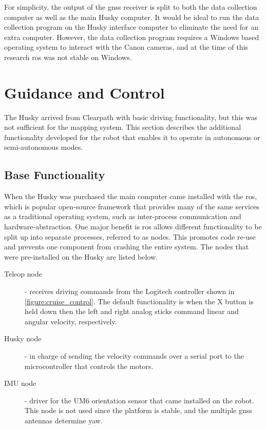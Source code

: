 For simplicity, the output of the \ac{gnss} receiver is split to both the data collection computer as well as the main Husky computer.  It would be ideal to run the data collection program on the Husky interface computer to eliminate the need for an extra computer.  However, the data collection program requires a Windows based operating system to interact with the Canon cameras, and at the time of this research \ac{ros} was not stable on Windows. 

\section{Guidance and Control}

The Husky arrived from Clearpath with basic driving functionality, but this was not sufficient for the mapping system.  This section describes the additional functionality developed for the robot that enables it to operate in autonomous or semi-autonomous modes.  

\subsection{Base Functionality}
\label{section:base_functionality}

When the Husky was purchased the main computer came installed with the \acl{ros}, which is popular open-source framework that provides many of the same services as a traditional operating system, such as inter-process communication and hardware-abstraction.  One major benefit is \ac{ros} allows different functionality to be split up into separate processes, referred to as nodes.  This promotes code re-use and prevents one component from crashing the entire system.   The nodes that were pre-installed on the Husky are listed below.

\begin{description}
\item[Teleop node] - receives driving commands from the Logitech controller shown in \ref{figure:cruise_control}.  The default functionality is when the X button is held down then the left and right analog sticks command linear and angular velocity, respectively.
\item[Husky node] - in charge of sending the velocity commands over a serial port to the microcontroller that controls the motors.  
\item[IMU node] - driver for the UM6 orientation sensor that came installed on the robot.  This node is not used since the platform is stable, and the multiple \ac{gnss} antennas determine yaw.
\end{description}

